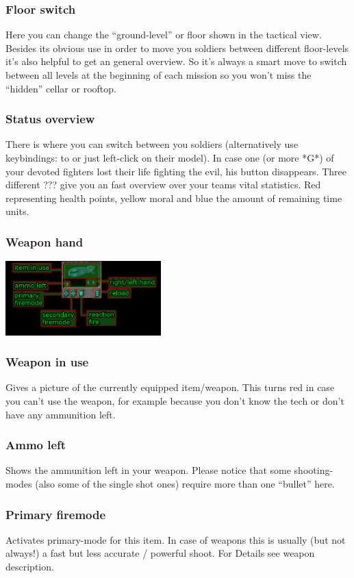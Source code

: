 \subsubsection{Floor switch}
Here you can change the ``ground-level'' or floor shown in the tactical view. Besides its obvious use in order to move you soldiers between different floor-levels it's also helpful to get an general overview. So it's always a smart move to switch between all levels at the beginning of each mission so you won't miss the ``hidden'' cellar or rooftop.
\subsubsection{Status overview}
There is where you can switch between you soldiers (alternatively use keybindings:  to  or just left-click on their model). In case one (or more *G*) of your devoted fighters lost their life fighting the evil, his button disappears. Three different ??? give you an fast overview over your teams vital statistics. Red representing health points, yellow moral and blue the amount of remaining time units.
\subsubsection{Weapon hand}
\includegraphics[width=6cm]{images/altHUD_detail_final.jpg}

\subsubsection{Weapon in use}
Gives a picture of the currently equipped item/weapon. This turns red in case you can't use the weapon, for example because you don't know the tech or don't have any ammunition left.
\subsubsection{Ammo left}
Shows the ammunition left in your weapon. Please notice that some shooting-modes (also some of the single shot ones) require more than one ``bullet'' here.
\subsubsection{Primary firemode}
Activates primary-mode for this item. In case of weapons this is usually (but not always!) a fast but less accurate / powerful shoot. For Details see weapon description.
